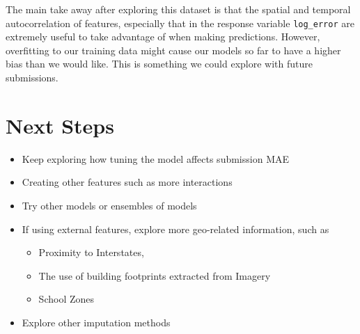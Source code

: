 \documentclass[]{book}
\providecommand{\tightlist}{%
  \setlength{\itemsep}{0pt}\setlength{\parskip}{0pt}}
\theoremstyle{definition}
\theoremstyle{definition}
\theoremstyle{definition}
\theoremstyle{remark}
\begin{document}
The main take away after exploring this dataset is that the spatial and
temporal autocorrelation of features, especially that in the response
variable \texttt{log\_error} are extremely useful to take advantage of
when making predictions. However, overfitting to our training data might
cause our models so far to have a higher bias than we would like. This
is something we could explore with future submissions.

\section{Next Steps}\label{next-steps}

\begin{itemize}
\tightlist
\item
  Keep exploring how tuning the model affects submission MAE
\item
  Creating other features such as more interactions
\item
  Try other models or ensembles of models
\item
  If using external features, explore more geo-related information, such
  as

  \begin{itemize}
  \tightlist
  \item
    Proximity to Interstates,
  \item
    The use of building footprints extracted from Imagery
  \item
    School Zones
  \end{itemize}
\item
  Explore other imputation methods
\end{itemize}


\end{document}

